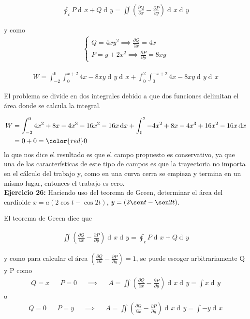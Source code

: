 \documentclass[12pt]{article}
\DeclareMathOperator{\di}{d\!}
\begin{document}
\begin{align*}
	\oint_c P \di x + Q \di y = \iint \left( \frac{\partial Q}{\partial x} 
	- \frac{\partial P}{\partial y} \right) \di x \di y
\end{align*}

y como 
\begin{align*}
	\begin{cases}
		Q = 4xy^2 \implies 	\frac{\partial Q}{\partial x} = 4x \\ 
		P = y + 2x^2 \implies  \frac{\partial P}{\partial y} = 8xy	
	\end{cases}
\end{align*}

\begin{align*}
	W = \int_{-2}^{0} \int_0^{x+2} 4x -8xy \di y \di x 
	+ \int_0^2 \int_0^{-x+2} 4x-8xy \di y \di x
\end{align*}

El problema se divide en dos integrales debido a que dos funciones delimitan el área donde
se calcula la integral.

\begin{align*}
	W &= \int_{-2}^0 4x^2 + 8x - 4x^3 - 16x^2 -16x \di x + \int_0^2 -4x^2 + 8x -4 x^3 + 16x^2
	- 16x \di x \\
	& = 0 + 0 = \color{red} 0
\end{align*}
lo que nos dice el resultado es que el campo propuesto es conservativo, ya que una de las 
características de este tipo de campos es que la trayectoria no importa en el cálculo del
trabajo y, como en una curva cerra se empieza y termina en un mismo lugar, entonces
el trabajo es cero.
\\
\noindent \textbf{Ejercicio 26:} Haciendo uso del teorema de Green, determinar el área del 
cardioide $x = a(2\cos t - \cos 2t)$, $y = (2\sen t - \sen 2t)$.
\vspace{5mm}

\vspace{3mm}
El teorema de Green dice que 

\begin{align*}
	\iint \left( \frac{\partial Q}{\partial x} 
	- \frac{\partial P}{\partial y} \right) \di x \di y =
	\oint_c P \di x + Q \di y  
\end{align*}

y como para calcular el área $\left( \frac{\partial Q}{\partial x} 
- \frac{\partial P}{\partial y} \right) = 1$, se puede escoger
arbitrariamente Q y P como
\begin{align*}
	Q = x && P = 0 &&\implies  &&A = \iint \left( \frac{\partial Q}{\partial x} 
	- \frac{\partial P}{\partial y} \right) \di x \di y = \int x \di y
\end{align*}
o
\begin{align*}
	Q = 0 && P = y &&\implies  &&A = \iint \left( \frac{\partial Q}{\partial x} 
	- \frac{\partial P}{\partial y} \right) \di x \di y = \int -y \di x
\end{align*}
\end{document}
